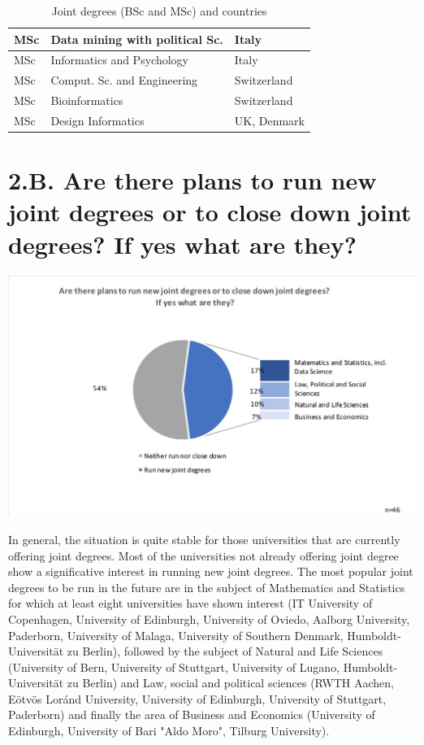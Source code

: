 \begin{table}
\begin{center}
\begin{tabular}  {|l|l|l|}
\hline
MSc & Data mining with political Sc.  &  Italy\\
\hline
MSc&  Informatics and Psychology   &  Italy\\
\hline
MSc & Comput. Sc. and Engineering & Switzerland\\
\hline
MSc& Bioinformatics  & Switzerland\\
\hline
MSc & Design Informatics    & UK, Denmark\\
\hline
\end{tabular}
\caption{Joint degrees (BSc and MSc) and countries}
\label{titles}
\end{center}
\end{table}


\section{2.B. Are there plans to run new joint degrees or to close down joint degrees? If yes what are they?}

\includegraphics[width = \linewidth]{charts/2b.jpg}

In general, the situation is  quite stable for those universities that are currently offering joint degrees. Most of the universities not already offering joint degree show a significative interest in running new joint degrees. The most popular joint degrees to be run in the future are in the subject of Mathematics and Statistics for which at least eight universities have shown interest (IT University of Copenhagen, University of Edinburgh, University of Oviedo, Aalborg University, Paderborn, University of Malaga, University of Southern Denmark, Humboldt-Universität zu Berlin), followed by the subject of 
Natural and Life Sciences (University of Bern, University of Stuttgart, University of Lugano, Humboldt-Universität zu Berlin) and 
Law, social and political sciences (RWTH Aachen, Eötvös Loránd University, University of Edinburgh, University of Stuttgart, Paderborn) and finally the area of  Business and Economics (University of Edinburgh, University of Bari "Aldo Moro", Tilburg University). 

